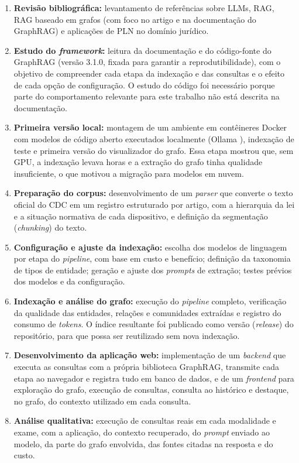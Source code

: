 \begin{enumerate}
    \item \textbf{Revisão bibliográfica:} levantamento de referências sobre LLMs, RAG, RAG baseado em grafos (com foco no artigo e na documentação do GraphRAG) e aplicações de PLN no domínio jurídico.

    \item \textbf{Estudo do \textit{framework}:} leitura da documentação e do código-fonte do GraphRAG (versão 3.1.0, fixada para garantir a reprodutibilidade), com o objetivo de compreender cada etapa da indexação e das consultas e o efeito de cada opção de configuração. O estudo do código foi necessário porque parte do comportamento relevante para este trabalho não está descrita na documentação.

    \item \textbf{Primeira versão local:} montagem de um ambiente em contêineres Docker com modelos de código aberto executados localmente (Ollama \cite{ollama}), indexação de teste e primeira versão do visualizador do grafo. Essa etapa mostrou que, sem GPU, a indexação levava horas e a extração do grafo tinha qualidade insuficiente, o que motivou a migração para modelos em nuvem.

    \item \textbf{Preparação do corpus:} desenvolvimento de um \textit{parser} que converte o texto oficial do CDC em um registro estruturado por artigo, com a hierarquia da lei e a situação normativa de cada dispositivo, e definição da segmentação (\textit{chunking}) do texto.

    \item \textbf{Configuração e ajuste da indexação:} escolha dos modelos de linguagem por etapa do \textit{pipeline}, com base em custo e benefício; definição da taxonomia de tipos de entidade; geração e ajuste dos \textit{prompts} de extração; testes prévios dos modelos e da configuração.

    \item \textbf{Indexação e análise do grafo:} execução do \textit{pipeline} completo, verificação da qualidade das entidades, relações e comunidades extraídas e registro do consumo de \textit{tokens}. O índice resultante foi publicado como versão (\textit{release}) do repositório, para que possa ser reutilizado sem nova indexação.

    \item \textbf{Desenvolvimento da aplicação web:} implementação de um \textit{backend} que executa as consultas com a própria biblioteca GraphRAG, transmite cada etapa ao navegador e registra tudo em banco de dados, e de um \textit{frontend} para exploração do grafo, execução de consultas, consulta ao histórico e destaque, no grafo, do contexto utilizado em cada consulta.

    \item \textbf{Análise qualitativa:} execução de consultas reais em cada modalidade e exame, com a aplicação, do contexto recuperado, do \textit{prompt} enviado ao modelo, da parte do grafo envolvida, das fontes citadas na resposta e do custo.
\end{enumerate}

